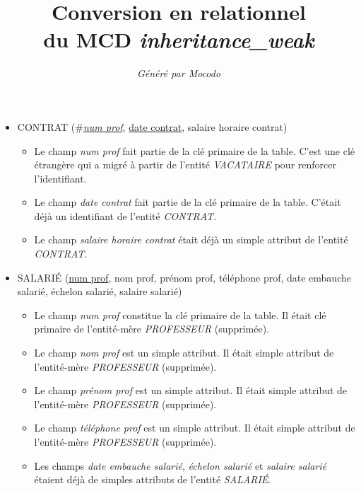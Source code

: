 \documentclass[a4paper]{article}
\title{Conversion en relationnel\\du MCD \emph{inheritance\_weak}}
\author{\emph{Généré par Mocodo}}
\newcommand{\relat}[1]{\textsc{#1}}
\newcommand{\attr}[1]{#1}
\newcommand{\prim}[1]{\uline{#1}}
\newcommand{\foreign}[1]{\#\textsl{#1}}
\begin{document}
\maketitle

\begin{itemize}
  \item \relat{CONTRAT} (\foreign{\prim{num prof}}, \prim{date contrat}, \attr{salaire horaire contrat})
  \begin{itemize}
    \item Le champ \emph{num prof} fait partie de la clé primaire de la table. C'est une clé étrangère qui a migré à partir de l'entité \emph{VACATAIRE} pour renforcer l'identifiant.
    \item Le champ \emph{date contrat} fait partie de la clé primaire de la table. C'était déjà un identifiant de l'entité \emph{CONTRAT}.
    \item Le champ \emph{salaire horaire contrat} était déjà un simple attribut de l'entité \emph{CONTRAT}.
  \end{itemize}

  \item \relat{SALARIÉ} (\prim{num prof}, \attr{nom prof}, \attr{prénom prof}, \attr{téléphone prof}, \attr{date embauche salarié}, \attr{échelon salarié}, \attr{salaire salarié})
  \begin{itemize}
    \item Le champ \emph{num prof} constitue la clé primaire de la table. Il était clé primaire de l'entité-mère \emph{PROFESSEUR} (supprimée).
    \item Le champ \emph{nom prof} est un simple attribut. Il était simple attribut de l'entité-mère \emph{PROFESSEUR} (supprimée).
    \item Le champ \emph{prénom prof} est un simple attribut. Il était simple attribut de l'entité-mère \emph{PROFESSEUR} (supprimée).
    \item Le champ \emph{téléphone prof} est un simple attribut. Il était simple attribut de l'entité-mère \emph{PROFESSEUR} (supprimée).
    \item Les champs \emph{date embauche salarié}, \emph{échelon salarié} et \emph{salaire salarié} étaient déjà de simples attributs de l'entité \emph{SALARIÉ}.
  \end{itemize}


\end{itemize}
\end{document}
